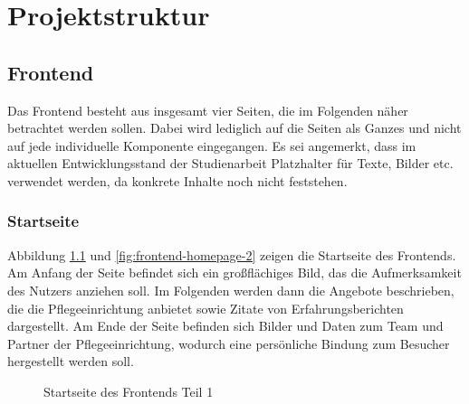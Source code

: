 \chapter{Projektstruktur}

%
%
\section{Frontend}
Das Frontend besteht aus insgesamt vier Seiten, die im Folgenden näher betrachtet werden sollen. Dabei wird lediglich auf die Seiten als Ganzes und nicht auf jede individuelle Komponente eingegangen. Es sei angemerkt, dass im aktuellen Entwicklungsstand der Studienarbeit Platzhalter für Texte, Bilder etc. verwendet werden, da konkrete Inhalte noch nicht feststehen.

%
%
\subsection{Startseite}

Abbildung \ref{fig:frontend-homepage-1} und \ref{fig:frontend-homepage-2} zeigen die Startseite des Frontends. Am Anfang der Seite befindet sich ein großflächiges Bild, das die Aufmerksamkeit des Nutzers anziehen soll. Im Folgenden werden dann die Angebote beschrieben, die die Pflegeeinrichtung anbietet sowie Zitate von Erfahrungsberichten dargestellt. Am Ende der Seite befinden sich Bilder und Daten zum Team und Partner der Pflegeeinrichtung, wodurch eine persönliche Bindung zum Besucher hergestellt werden soll.

\begin{figure}[H]
  \setlength{\fboxsep}{0pt}
  \setlength{\fboxrule}{0.5pt}
  \centering
  \caption[Startseite des Frontends Teil 1]{Startseite des Frontends Teil 1}
  \label{fig:frontend-homepage-1}
\end{figure}

